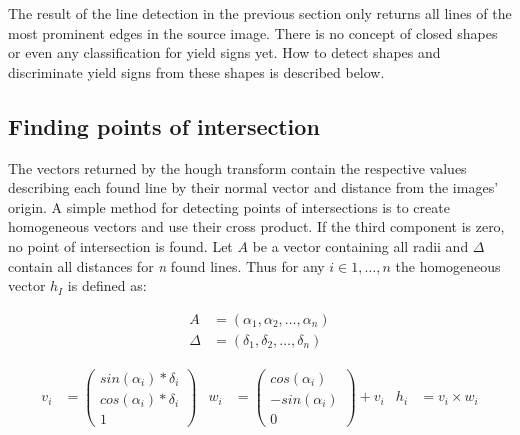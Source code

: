 \documentclass{report}
\begin{document}
The result of the line detection in the previous section only returns
all lines of the most prominent edges in the source image. There is no
concept of closed shapes or even any classification for yield signs
yet. How to detect shapes and discriminate yield signs from these
shapes is described below.


\subsection{Finding points of intersection}

The vectors returned by the hough transform contain the respective
values describing each found line by their normal vector and distance
from the images' origin. A simple method for detecting points of
intersections is to create homogeneous vectors and use their cross
product. If the third component is zero, no point of intersection is
found. Let \( A \) be a vector containing all radii and \( \Delta \)
contain all distances for \textit{n} found lines. Thus for any \( i
\in 1, \dots, n \) the homogeneous vector \( h_I \) is defined as:

\begin{equation}
  \begin{split}
    A & = (\alpha_1, \alpha_2, \dots, \alpha_n) \\
    \Delta & = (\delta_1, \delta_2, \dots, \delta_n)
  \end{split}
\end{equation}

\begin{align}\label{eq:poi}
  v_i & = \begin{pmatrix}
    sin(\alpha_i) * \delta_i \\ cos(\alpha_i) * \delta_i \\ 1
  \end{pmatrix}
  &
  w_i & = \begin{pmatrix}
    cos(\alpha_i) \\ -sin(\alpha_i) \\ 0
  \end{pmatrix} + v_i
  &
  h_i & = v_i \times w_i
\end{align}
\end{document}
